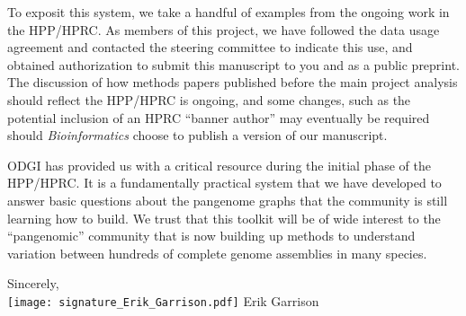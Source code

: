 \documentclass[12pt,hidelinks,letterpaper]{article}
\begin{document}
To exposit this system, we take a handful of examples from the ongoing work in the HPP/HPRC.
As members of this project, we have followed the data usage agreement and contacted the steering committee to indicate this use, and obtained authorization to submit this manuscript to you and as a public preprint.
The discussion of how methods papers published before the main project analysis should reflect the HPP/HPRC is ongoing, and some changes, such as the potential inclusion of an HPRC ``banner author'' may eventually be required should \textit{Bioinformatics} choose to publish a version of our manuscript.

ODGI has provided us with a critical resource during the initial phase of the HPP/HPRC.
It is a fundamentally practical system that we have developed to answer basic questions about the pangenome graphs that the community is still learning how to build.
We trust that this toolkit will be of wide interest to the ``pangenomic'' community that is now building up methods to understand variation between hundreds of complete genome assemblies in many species.

\hfill \break


\indent Sincerely,\\
\hfill \break
\texttt{[image: signature\_Erik\_Garrison.pdf]}
\hfill \break
\indent Erik Garrison



\begin{comment}
\hfill \break
\begingroup
\let\oldthebibliography\thebibliography
\let\endoldthebibliography\endthebibliography
\renewenvironment{thebibliography}[1]{
  \begin{oldthebibliography}{#1}
    \setlength{\itemsep}{0em}
    \setlength{\parskip}{0em}
}
{
  \end{oldthebibliography}
}
\renewcommand{\section}[2]{}%

{\small }
\endgroup
\end{comment}
\end{document}
